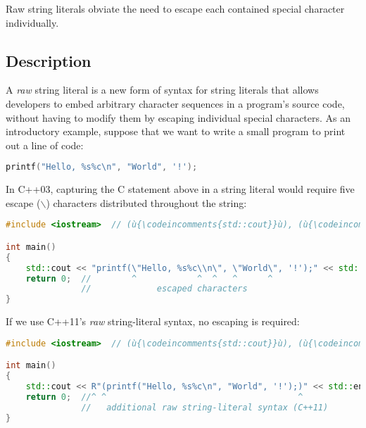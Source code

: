 

\setcounter{table}{0}
\setcounter{footnote}{0}
\setcounter{lstlisting}{0}

Raw string literals obviate the need to escape each contained special
character individually.

\subsection[Description]{Description}\label{description}

A \emph{raw} string literal is a new form of syntax for string literals
that allows developers to embed arbitrary character sequences in a
program's source code, without having to modify them by escaping
individual special characters. As an introductory example, suppose that
we want to write a small program to print out a line of code:

\begin{lstlisting}[language=C++]
printf("Hello, %s%c\n", "World", '!');
\end{lstlisting}

\noindent In C++03, capturing the C statement above in a string literal would
require five escape (\texttt{$\backslash$}) characters distributed
throughout the string:

\begin{lstlisting}[language=C++]
#include <iostream>  // (ù{\codeincomments{std::cout}}ù), (ù{\codeincomments{std::endl}}ù)

int main()
{
    std::cout << "printf(\"Hello, %s%c\\n\", \"World\", '!');" << std::endl;
    return 0;  //        ^            ^  ^   ^      ^
               //             escaped characters
}
\end{lstlisting}

\noindent If we use C++11's \emph{raw} string-literal syntax, no escaping is
required:

\begin{lstlisting}[language=C++]
#include <iostream>  // (ù{\codeincomments{std::cout}}ù), (ù{\codeincomments{std::endl}}ù)

int main()
{
    std::cout << R"(printf("Hello, %s%c\n", "World", '!');)" << std::endl;
    return 0;  //^ ^                                      ^
               //   additional raw string-literal syntax (C++11)
}
\end{lstlisting}

